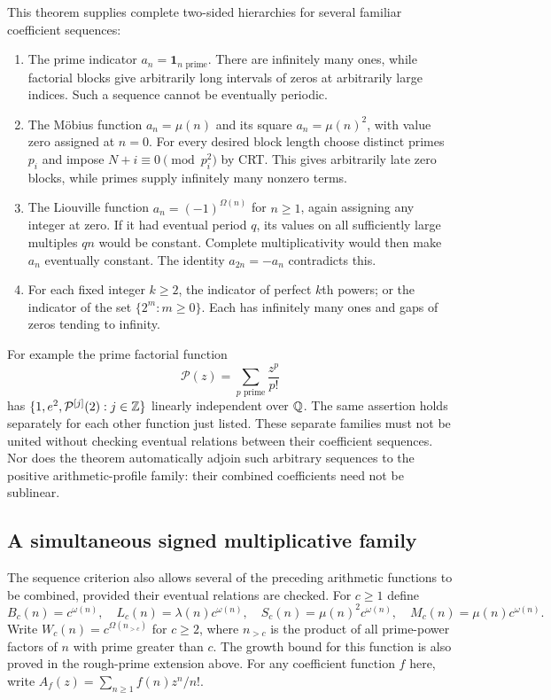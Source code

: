This theorem supplies complete two-sided hierarchies for several
familiar coefficient sequences:
\begin{enumerate}
\item The prime indicator $a_n=\mathbf1_{n\text{ prime}}$.
There are infinitely many ones, while factorial blocks give arbitrarily
long intervals of zeros at arbitrarily large indices.  Such a sequence
cannot be eventually periodic.
\item The M\"obius function $a_n=\mu(n)$ and its square
$a_n=\mu(n)^2$, with value zero assigned at $n=0$.
For every desired block length choose distinct primes $p_i$ and impose
$N+i\equiv0\pmod{p_i^2}$ by CRT.  This gives arbitrarily late zero
blocks, while primes supply infinitely many nonzero terms.
\item The Liouville function $a_n=(-1)^{\Omega(n)}$ for $n\geq1$,
again assigning any integer at zero.  If it had eventual period $q$,
its values on all sufficiently large multiples $qn$ would be constant.
Complete multiplicativity would then make $a_n$ eventually constant.
The identity $a_{2n}=-a_n$ contradicts this.
\item For each fixed integer $k\geq2$, the indicator of perfect
$k$th powers; or the indicator of the set $\{2^m:m\geq0\}$.
Each has infinitely many ones and gaps of zeros tending to infinity.
\end{enumerate}
For example the prime factorial function
\[
 \mathcal P(z)=\sum_{p\text{ prime}}\frac{z^p}{p!}
\]
has $\{1,e^2,\mathcal P^{[j]}(2):j\in\mathbb Z\}$ linearly independent
over $\mathbb Q$.  The same assertion holds separately for each other
function just listed.  These separate families must not be united
without checking eventual relations between their coefficient
sequences.  Nor does the theorem automatically adjoin such arbitrary
sequences to the positive arithmetic-profile family: their combined
coefficients need not be sublinear.

\subsection{A simultaneous signed multiplicative family}

The sequence criterion also allows several of the preceding arithmetic
functions to be combined, provided their eventual relations are checked.
For $c\geq1$ define
\[
 B_c(n)=c^{\omega(n)},\quad
 L_c(n)=\lambda(n)c^{\omega(n)},\quad
 S_c(n)=\mu(n)^2c^{\omega(n)},\quad
 M_c(n)=\mu(n)c^{\omega(n)}.
\]
Write $W_c(n)=c^{\Omega(n_{>c})}$ for $c\geq2$, where $n_{>c}$ is
the product of all prime-power factors of $n$ with prime greater than
$c$.  The growth bound for this function is also proved in the
rough-prime extension above.  For any coefficient function $f$ here,
write $A_f(z)=\sum_{n\geq1}f(n)z^n/n!$.

